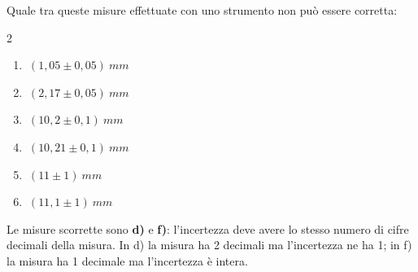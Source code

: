 \begin{question}[ID=3.1, subtitle={Misure scorrette per sensibilità dello strumento}, tags={sensibilità, errore}, difficulty=facile]
Quale tra queste misure effettuate con uno strumento non può essere corretta:
\begin{center}\begin{minipage}{0.92\linewidth}
\begin{multicols}{2}
\begin{enumerate}[leftmargin=3.2cm]
\item $\ (1{,}05 \pm 0{,}05)\ mm$
\item $\ (2{,}17 \pm 0{,}05)\ mm$
\item $\ (10{,}2 \pm 0{,}1)\ mm$
\item $\ (10{,}21 \pm 0{,}1)\ mm$
\item $\ (11 \pm 1)\ mm$
\item $\ (11{,}1 \pm 1)\ mm$
\end{enumerate}
\end{multicols}
\end{minipage}\end{center}
\begin{solution}
Le misure scorrette sono \textbf{d)} e \textbf{f)}: l'incertezza deve avere lo stesso numero di cifre decimali della misura. In d) la misura ha 2 decimali ma l'incertezza ne ha 1; in f) la misura ha 1 decimale ma l'incertezza è intera.
\end{solution}
\end{question}

